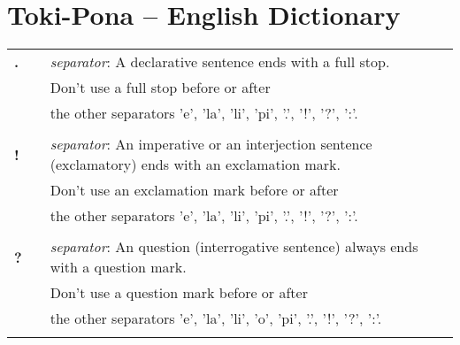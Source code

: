 
\section{Toki-Pona -- English Dictionary}
\label{'dict'}

\begin{supertabular}{p{2,5cm}|ll}
    \textbf{.}                   &  & \textit{separator}: A declarative sentence ends with a full stop.                                          \\
                                 &  & Don't use a full stop before or after                                                                      \\
                                 &  & the other separators 'e', 'la', 'li', 'pi', '.', '!', '?', ':'.                                            \\
                                 &  &                                                                                                            \\
    \textbf{!}                   &  & \textit{separator}: An imperative or an interjection sentence (exclamatory) ends with an exclamation mark. \\
                                 &  & Don't use an exclamation mark before or after                                                              \\
                                 &  & the other separators 'e', 'la', 'li', 'pi', '.', '!', '?', ':'.                                            \\
                                 &  &                                                                                                            \\
    \textbf{?}                   &  & \textit{separator}: An question (interrogative sentence) always ends with a question mark.                 \\
                                 &  & Don't use a question mark before or after                                                                  \\
                                 &  & the other separators 'e', 'la', 'li', 'o', 'pi', '.', '!', '?', ':'.                                       \\
                                 &  &                                                                                                            \\

\end{supertabular}
